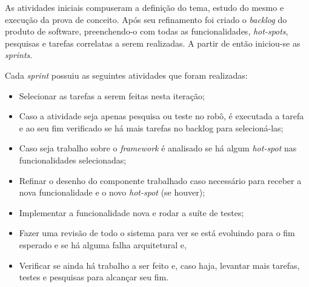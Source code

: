 As atividades iniciais compuseram a definição do tema, estudo do mesmo e execução da prova de conceito. Após seu refinamento foi criado o \textit{backlog} do produto de software, preenchendo-o com todas as funcionalidades, \textit{hot-spots}, pesquisas e tarefas correlatas a serem realizadas. A partir de então iniciou-se as \textit{sprints}.

Cada \textit{sprint} possuiu as seguintes atividades que foram realizadas: 
\begin{itemize}
  \item Selecionar as tarefas a serem feitas nesta iteração;
  \item Caso a atividade seja apenas pesquisa ou teste no robô, é executada a tarefa e ao seu fim verificado se há mais tarefas no backlog para selecioná-las;
  \item Caso seja trabalho sobre o \textit{framework} é analisado se há algum \textit{hot-spot} nas funcionalidades selecionadas;
  \item Refinar o desenho do componente trabalhado caso necessário para receber a nova funcionalidade e o novo \textit{hot-spot} (se houver);
  \item Implementar a funcionalidade nova e rodar a suíte de testes;
  \item Fazer uma revisão de todo o sistema para ver se está evoluindo para o fim esperado e se há alguma falha arquitetural e,
  \item Verificar se ainda há trabalho a ser feito e, caso haja, levantar mais tarefas, testes e pesquisas para alcançar seu fim.
\end{itemize} 

\newpage

